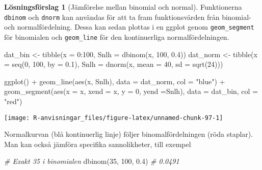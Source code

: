 \documentclass[
]{book}
\newenvironment{Shaded}{\begin{snugshade}}{\end{snugshade}}
\newcommand{\AttributeTok}[1]{\textcolor[rgb]{0.77,0.63,0.00}{#1}}
\newcommand{\CommentTok}[1]{\textcolor[rgb]{0.56,0.35,0.01}{\textit{#1}}}
\newcommand{\DecValTok}[1]{\textcolor[rgb]{0.00,0.00,0.81}{#1}}
\newcommand{\FloatTok}[1]{\textcolor[rgb]{0.00,0.00,0.81}{#1}}
\newcommand{\FunctionTok}[1]{\textcolor[rgb]{0.00,0.00,0.00}{#1}}
\newcommand{\NormalTok}[1]{#1}
\newcommand{\OtherTok}[1]{\textcolor[rgb]{0.56,0.35,0.01}{#1}}
\newcommand{\SpecialCharTok}[1]{\textcolor[rgb]{0.00,0.00,0.00}{#1}}
\newcommand{\StringTok}[1]{\textcolor[rgb]{0.31,0.60,0.02}{#1}}
\theoremstyle{definition}
\theoremstyle{definition}
\theoremstyle{definition}
\theoremstyle{definition}
\newtheorem{hypothesis}{Lösningsförslag}[chapter]
\theoremstyle{remark}
\begin{document}
\begin{hypothesis}[Jämförelse mellan binomial och normal]
Funktionerna \texttt{dbinom} och \texttt{dnorm} kan användas för att ta fram funktionsvärden från binomial- och normalfördelning. Dessa kan sedan plottas i en ggplot genom \texttt{geom\_segment} för binomialen och \texttt{geom\_line} för den kontinuerliga normalfördelningen.

\begin{Shaded}
\begin{Highlighting}[]
\NormalTok{dat\_bin }\OtherTok{\textless{}{-}} \FunctionTok{tibble}\NormalTok{(}\AttributeTok{x =} \DecValTok{0}\SpecialCharTok{:}\DecValTok{100}\NormalTok{,}
                  \AttributeTok{Snlh =} \FunctionTok{dbinom}\NormalTok{(x, }\DecValTok{100}\NormalTok{, }\FloatTok{0.4}\NormalTok{))}
\NormalTok{dat\_norm }\OtherTok{\textless{}{-}} \FunctionTok{tibble}\NormalTok{(}\AttributeTok{x =} \FunctionTok{seq}\NormalTok{(}\DecValTok{0}\NormalTok{, }\DecValTok{100}\NormalTok{, }\AttributeTok{by =} \FloatTok{0.1}\NormalTok{),}
                   \AttributeTok{Snlh =} \FunctionTok{dnorm}\NormalTok{(x, }\AttributeTok{mean =} \DecValTok{40}\NormalTok{, }\AttributeTok{sd =} \FunctionTok{sqrt}\NormalTok{(}\DecValTok{24}\NormalTok{)))}

\FunctionTok{ggplot}\NormalTok{() }\SpecialCharTok{+}
  \FunctionTok{geom\_line}\NormalTok{(}\FunctionTok{aes}\NormalTok{(x, Snlh), }\AttributeTok{data =}\NormalTok{ dat\_norm, }\AttributeTok{col =} \StringTok{"blue"}\NormalTok{) }\SpecialCharTok{+}
  \FunctionTok{geom\_segment}\NormalTok{(}\FunctionTok{aes}\NormalTok{(}\AttributeTok{x =}\NormalTok{ x, }\AttributeTok{xend =}\NormalTok{ x, }\AttributeTok{y =} \DecValTok{0}\NormalTok{, }\AttributeTok{yend =}\NormalTok{Snlh), }
               \AttributeTok{data =}\NormalTok{ dat\_bin, }\AttributeTok{col =} \StringTok{"red"}\NormalTok{) }
\end{Highlighting}
\end{Shaded}

\begin{center}\texttt{[image: R-anvisningar\_files/figure-latex/unnamed-chunk-97-1]} \end{center}

Normalkurvan (blå kontinuerlig linje) följer binomalfördelningen (röda staplar). Man kan också jämföra specifika sannolikheter, till exempel

\begin{Shaded}
\begin{Highlighting}[]
\CommentTok{\# Exakt 35 i binomialen}
\FunctionTok{dbinom}\NormalTok{(}\DecValTok{35}\NormalTok{, }\DecValTok{100}\NormalTok{, }\FloatTok{0.4}\NormalTok{) }\CommentTok{\# 0.0491}
\end{Highlighting}
\end{Shaded}


\end{hypothesis}
\end{document}
